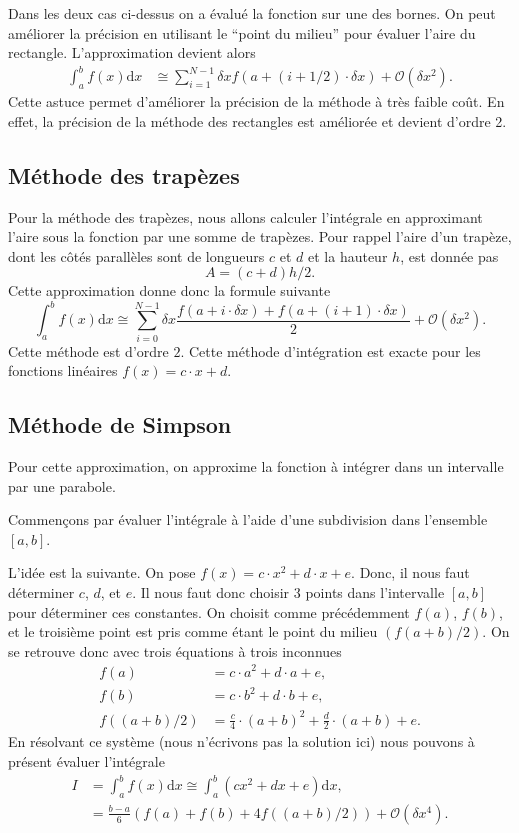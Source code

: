 \documentclass[a4paper,12pt]{book}
\newcommand{\dd}{\mathrm{d}}
\begin{document}
Dans les deux cas ci-dessus on a évalué la fonction sur une des bornes. On peut améliorer la précision
en utilisant le ``point du milieu'' pour évaluer l'aire du rectangle. L'approximation devient alors
\begin{align}
 \int_a^bf(x)\dd x&\cong\sum_{i=1}^{N-1} \delta x f(a+(i+1/2)\cdot\delta x)+\mathcal{O}(\delta x^2).
\end{align}
Cette astuce permet d'améliorer la précision de la méthode à très faible coût.
En effet, la précision de la méthode des rectangles est améliorée et devient d'ordre 2.

\subsection{Méthode des trapèzes}

Pour la méthode des trapèzes, nous allons calculer l'intégrale en approximant l'aire sous la fonction par une somme de trapèzes.
Pour rappel l'aire d'un trapèze, dont les côtés parallèles sont de longueurs $c$ et $d$ et la hauteur $h$, est donnée pas
\begin{equation}
 A=(c+d)h/2. 
\end{equation}
Cette approximation donne donc la formule suivante
\begin{equation}
 \int_a^bf(x)\dd x\cong\sum_{i=0}^{N-1} \delta x \frac{f(a+i\cdot\delta x)+f(a+(i+1)\cdot\delta x)}{2}+\mathcal{O}(\delta x^2).
\end{equation}
Cette méthode est d'ordre $2$. Cette méthode d'intégration est exacte pour les fonctions linéaires $f(x)=c\cdot x + d$.

\subsection{Méthode de Simpson}

Pour cette approximation, on approxime la fonction à intégrer dans un intervalle par une parabole.

Commençons par évaluer l'intégrale à l'aide d'une subdivision dans l'ensemble $[a,b]$.

L'idée est la suivante. On pose $f(x)=c\cdot x^2+d\cdot x+e$. Donc, il nous faut déterminer $c$, $d$, et $e$.
Il nous faut donc choisir 3 points dans l'intervalle $[a,b]$ pour déterminer ces constantes.
On choisit comme précédemment $f(a)$, $f(b)$, et le troisième point est pris comme étant le point du milieu
$(f(a+b)/2)$. On se retrouve donc avec trois équations à trois inconnues
\begin{align}
 f(a)&=c\cdot a^2+d\cdot a+e,\\
 f(b)&=c\cdot b^2+d\cdot b+e,\\
 f((a+b)/2)&=\frac{c}{4}\cdot (a+b)^2+\frac{d}{2}\cdot (a+b)+e.
\end{align}
En résolvant ce système (nous n'écrivons pas la solution ici) nous pouvons à présent évaluer 
l'intégrale 
\begin{align}
 I&=\int_a^b f(x)\dd x\cong\int_a^b (cx^2+dx+e)\dd x,\nonumber\\
 &=\frac{b-a}{6}(f(a)+f(b)+4f((a+b)/2))+\mathcal{O}(\delta x^4).
\end{align}
\end{document}
